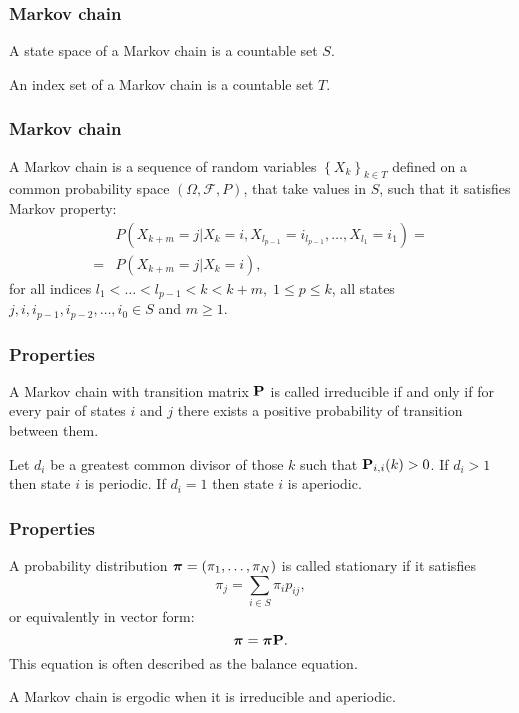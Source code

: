 \begin{frame}
	\frametitle{Markov chain}
	\begin{definition}
		 A state space of a Markov chain is a countable set $S$.
	\end{definition}
	\begin{definition}
		An index set of a Markov chain is a countable set $T$.
	\end{definition}
\end{frame}

\begin{frame}
	\frametitle{Markov chain}
	\begin{definition}
		A Markov chain is a sequence of random variables $\left\{X_k\right\}_{k \in T}$ defined on a common probability space $\left( \Omega, \mathcal{F}, P \right)$, that take values in $S$, such that it satisfies Markov property:
		\begin{align*}
			&P(X_{k+m} = j | X_k = i, X_{l_{p-1}} = i_{l_{p-1}}, \ldots, X_{l_1} = i_1) = \\= &P(X_{k+m} = j | X_k = i),
		\end{align*}
		for all indices $l_1< \ldots < l_{p-1} < k < k+m, \; 1 \leq p \leq k$, all states $j, i, i_{p-1}, i_{p-2}, \ldots, i_0 \in S$ and $m \geq 1$.
	\end{definition}
\end{frame}

\begin{frame}
	\frametitle{Properties}
	\begin{definition}[Irreducibility]
		A Markov chain with transition matrix $\mathbf{P}$ is called irreducible if and only if for every pair of states $i$ and $j$ there exists a positive probability of transition between them.
	\end{definition}
	\begin{definition}[Periodicity]
		Let $d_i$ be a greatest common divisor of those $k$ such that $\mathbf{P}_{i,i}(k)>0$. If $d_i > 1$ then state $i$ is periodic. If $d_i = 1$ then state $i$ is aperiodic.
	\end{definition}
\end{frame}

\begin{frame}
	\frametitle{Properties}
	\begin{definition}[Stationarity]
		A probability distribution $\boldsymbol{\pi} = (\pi_1, \ldots, \pi_N)$ is called stationary if it satisfies
		\begin{equation*}
		\pi_j = \sum_{i \in S} \pi_i p_{ij},
		\end{equation*}
		or equivalently in vector form:
		\begin{equation*}
		\boldsymbol{\pi} = \boldsymbol{\pi} \mathbf{P}.
		\end{equation*}
		This equation is often described as the balance equation.
	\end{definition}
	\begin{definition}[Ergodicity]
		A Markov chain is ergodic when it is irreducible and aperiodic.
	\end{definition}
\end{frame}

